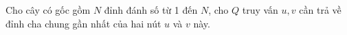 Cho cây có gốc gồm $N$ đỉnh đánh số từ 1 đến $N$, cho $Q$ truy vấn $u, v$ cần trả về đỉnh cha chung gần nhất của hai nút $u$ và $v$ này.
